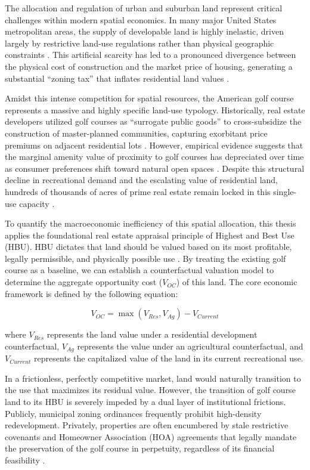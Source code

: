 \documentclass[10pt, letterpaper]{article}
\begin{document}
The allocation and regulation of urban and suburban land represent critical challenges within modern spatial economics. In many major United States metropolitan areas, the supply of developable land is highly inelastic, driven largely by restrictive land-use regulations rather than physical geographic constraints \parencite{Glaeser2017, Gyourko2021}. This artificial scarcity has led to a pronounced divergence between the physical cost of construction and the market price of housing, generating a substantial ``zoning tax'' that inflates residential land values \parencite{Glaeser2005, Davis2021}. 

Amidst this intense competition for spatial resources, the American golf course represents a massive and highly specific land-use typology. Historically, real estate developers utilized golf courses as ``surrogate public goods'' to cross-subsidize the construction of master-planned communities, capturing exorbitant price premiums on adjacent residential lots \parencite{Limehouse2012}. However, empirical evidence suggests that the marginal amenity value of proximity to golf courses has depreciated over time as consumer preferences shift toward natural open spaces \parencite{Cho2009}. Despite this structural decline in recreational demand and the escalating value of residential land, hundreds of thousands of acres of prime real estate remain locked in this single-use capacity \parencite{Weinand2025}.

To quantify the macroeconomic inefficiency of this spatial allocation, this thesis applies the foundational real estate appraisal principle of Highest and Best Use (HBU). HBU dictates that land should be valued based on its most profitable, legally permissible, and physically possible use \parencite{AppraisalInstitute2020}. By treating the existing golf course as a baseline, we can establish a counterfactual valuation model to determine the aggregate opportunity cost ($V_{OC}$) of this land. The core economic framework is defined by the following equation:

\begin{equation}
    V_{OC} = \max(V_{Res}, V_{Ag}) - V_{Current}
\end{equation}

where $V_{Res}$ represents the land value under a residential development counterfactual, $V_{Ag}$ represents the value under an agricultural counterfactual, and $V_{Current}$ represents the capitalized value of the land in its current recreational use. 

In a frictionless, perfectly competitive market, land would naturally transition to the use that maximizes its residual value. However, the transition of golf course land to its HBU is severely impeded by a dual layer of institutional frictions. Publicly, municipal zoning ordinances frequently prohibit high-density redevelopment. Privately, properties are often encumbered by stale restrictive covenants and Homeowner Association (HOA) agreements that legally mandate the preservation of the golf course in perpetuity, regardless of its financial feasibility \parencite{Ellickson2022, Korngold2024}. 
\end{document}
